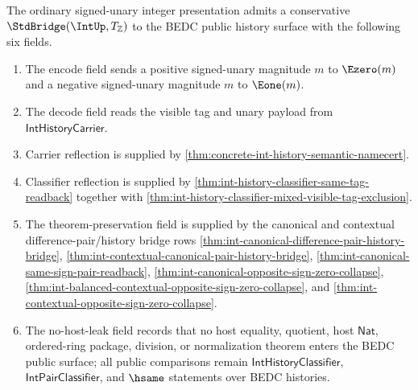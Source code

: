 \begin{theorem}
\label{thm:int-signed-unary-standard-bridge}
The ordinary signed-unary integer presentation admits a conservative
$\StdBridge(\IntUp,T_{\mathbb{Z}})$ to the BEDC public history surface with the
following six fields.
\begin{enumerate}
  \item The encode field sends a positive signed-unary magnitude $m$ to
  $\Ezero(m)$ and a negative signed-unary magnitude $m$ to $\Eone(m)$.
  \item The decode field reads the visible tag and unary payload from
  $\mathsf{IntHistoryCarrier}$.
  \item Carrier reflection is supplied by
  \autoref{thm:concrete-int-history-semantic-namecert}.
  \item Classifier reflection is supplied by
  \autoref{thm:int-history-classifier-same-tag-readback} together with
  \autoref{thm:int-history-classifier-mixed-visible-tag-exclusion}.
  \item The theorem-preservation field is supplied by the canonical and
  contextual difference-pair/history bridge rows
  \autoref{thm:int-canonical-difference-pair-history-bridge},
  \autoref{thm:int-contextual-canonical-pair-history-bridge},
  \autoref{thm:int-canonical-same-sign-pair-readback},
  \autoref{thm:int-canonical-opposite-sign-zero-collapse},
  \autoref{thm:int-balanced-contextual-opposite-sign-zero-collapse}, and
  \autoref{thm:int-contextual-opposite-sign-zero-collapse}.
  \item The no-host-leak field records that no host equality, quotient, host
  $\mathsf{Nat}$, ordered-ring package, division, or normalization theorem enters
  the BEDC public surface; all public comparisons remain
  $\mathsf{IntHistoryClassifier}$, $\mathsf{IntPairClassifier}$, and $\hsame$
  statements over BEDC histories.
\end{enumerate}
\end{theorem}
